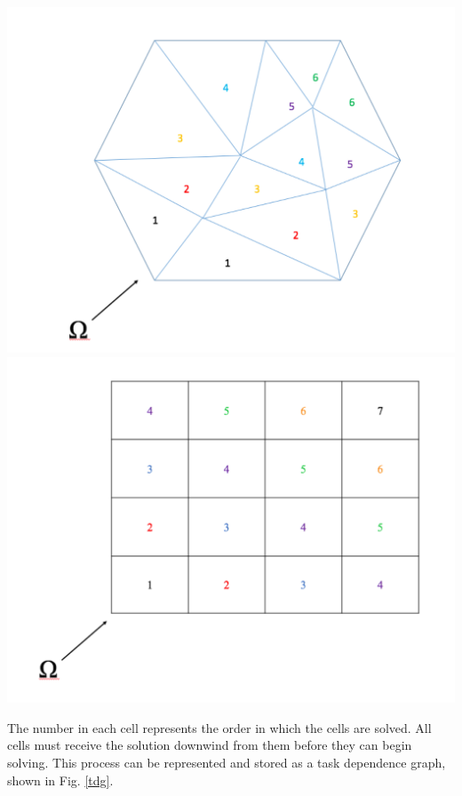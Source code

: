 \documentclass[11pt, letterpaper,titlepage,oneside]{article}
\begin{document}
\noindent\begin{minipage}{\textwidth}
\centering
\includegraphics[scale = 0.27]{../figures/UnstructureMesh.pdf}
\includegraphics[scale = 0.27]{../figures/StructuredMesh.pdf}
\label{sweeps}
\end{minipage}
\smallskip

The number in each cell represents the order in which the cells are solved. All cells must receive the solution downwind from them before they can begin solving. This process can be represented and stored as a task dependence graph, shown in Fig. \ref{tdg}.
\end{document}
